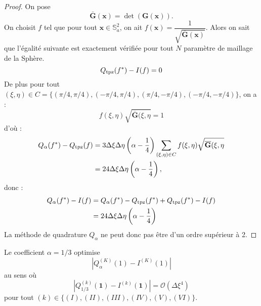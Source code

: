 \begin{proof}
On pose
\begin{equation}
\bar{\mathbf{G}}(\mathbf{x}) = \det (\mathbf{G}(\mathbf{x})).
\end{equation}
On choisit $f$ tel que pour tout $\mathbf{x} \in \mathbb{S}_a^2$, on ait $f(\mathbf{x})=\dfrac{1}{\sqrt{\overline{\mathbf{G}}(\mathbf{x})}}$. Alors on sait que l’égalité suivante est exactement vérifiée pour tout $N$ paramètre de maillage de la Sphère.
\begin{equation}
Q_{\text{tpz}}(f^*)-I(f)=0
\end{equation}
De plus pour tout $(\xi,\eta) \in C=\{(\pi/4,\pi/4),(-\pi/4,\pi/4),(\pi/4,-\pi/4),(-\pi/4,-\pi/4) \}$, on a :
\begin{equation}
f(\xi,\eta)\sqrt{\overline{\mathbf{G}}(\xi,\eta}=1
\end{equation}
d'où :
\begin{align*}
Q_{\alpha}(f^*)-Q_{\text{tpz}}(f) & = 3 \Delta \xi \Delta \eta \left( \alpha - \dfrac{1}{4} \right)\displaystyle\sum\limits_{(\xi,\eta)\in C} f(\xi,\eta)\sqrt{\overline{\mathbf{G}}(\xi,\eta} \\
                         & = 24 \Delta \xi \Delta \eta \left( \alpha - \dfrac{1}{4} \right),
\end{align*}
donc :
\begin{align*}
Q_{\alpha}(f^*) - I(f) & = Q_{\alpha}(f^*) - Q_{\text{tpz}}(f^*) + Q_{\text{tpz}}(f^*) - I(f) \\
                    & = 24 \Delta \xi \Delta \eta \left( \alpha - \dfrac{1}{4} \right)
\end{align*}
La méthode de quadrature $Q_{\alpha}$ ne peut donc pas être d'un ordre supérieur à 2. 
\end{proof}



\begin{proposition}
Le coefficient $\alpha=1/3$ optimise
\begin{equation}
|Q_{\alpha}^{(K)}(1) - I^{(K)}(1) |
\end{equation}
au sens où
\begin{equation}
|Q_{1/3}^{(k)}(\mathbf{1}) - I^{(k)}(\mathbf{1}) | = \mathcal{O}\left( \Delta \xi^4 \right)
\end{equation}
pour tout $(k) \in \lbrace (I), (II), (III), (IV), (V), (VI) \rbrace$.
\end{proposition}

